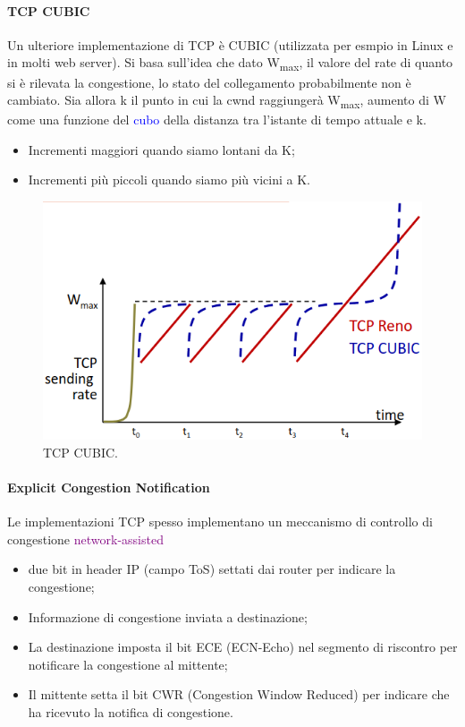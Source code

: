 \paragraph{TCP CUBIC}
Un ulteriore implementazione di TCP è CUBIC (utilizzata per esmpio in Linux e in molti web server). 
Si basa sull'idea che dato W\textsubscript{max}, il valore del rate di quanto si è rilevata la congestione, lo stato del collegamento probabilmente non è cambiato. 
Sia allora k il punto in cui la cwnd raggiungerà W\textsubscript{max}, aumento di W come una funzione del \textcolor{blue}{cubo} della distanza tra l’istante di tempo attuale e k.
\begin{itemize}
    \item Incrementi maggiori quando siamo lontani da K;
    \item Incrementi più piccoli quando siamo più vicini a K.
\end{itemize}
\begin{figure}[h]
    \centering
    \includegraphics[scale=0.37]{Immagini/TCPCUBIC.png}
    \caption{TCP CUBIC.}
\end{figure}

\paragraph{Explicit Congestion Notification}
Le implementazioni TCP spesso implementano un meccanismo di controllo di congestione \textcolor{purple}{network-assisted}
\begin{itemize}
    \item due bit in header IP (campo ToS) settati dai router per indicare la congestione;
    \item Informazione di congestione inviata a destinazione;
    \item La destinazione imposta il bit ECE (ECN-Echo) nel segmento di riscontro per notificare la congestione al mittente;
    \item Il mittente setta il bit CWR (Congestion Window Reduced) per indicare che ha ricevuto la notifica di congestione.
\end{itemize}

